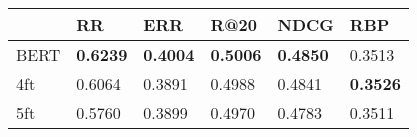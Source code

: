 \begin{tabular}{llllll}
\toprule
{} &               RR &              ERR &             R@20 &            NDCG &              RBP \\
\midrule
BERT &  \textbf{0.6239} &  \textbf{0.4004} &  \textbf{0.5006} &  \textbf{0.4850} &           0.3513 \\
4ft  &           0.6064 &           0.3891 &           0.4988 &          0.4841 &  \textbf{0.3526} \\
5ft  &            0.5760 &           0.3899 &            0.4970 &          0.4783 &           0.3511 \\
\bottomrule
\end{tabular}
